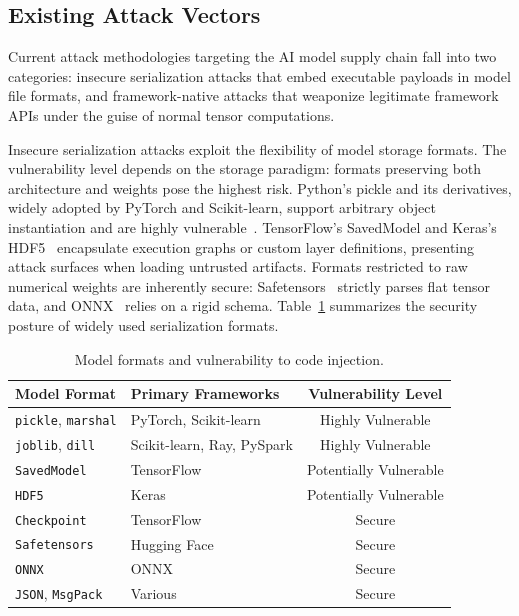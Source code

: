 \subsection{Existing Attack Vectors}


Current attack methodologies targeting the AI model supply chain fall into two categories: insecure serialization attacks that embed executable payloads in model file formats, and framework-native attacks that weaponize legitimate framework APIs under the guise of normal tensor computations.

Insecure serialization attacks exploit the flexibility of model storage formats. The vulnerability level depends on the storage paradigm: formats preserving both architecture and weights pose the highest risk. Python's pickle and its derivatives, widely adopted by PyTorch and Scikit-learn, support arbitrary object instantiation and are highly vulnerable~\cite{python_pickle, liu2025arthideseekmaking}. TensorFlow's SavedModel and Keras's HDF5~\cite{hdf5} encapsulate execution graphs or custom layer definitions, presenting attack surfaces when loading untrusted artifacts. Formats restricted to raw numerical weights are inherently secure: Safetensors~\cite{safetensors2023} strictly parses flat tensor data, and ONNX~\cite{onnx2019} relies on a rigid schema. Table~\ref{tab:formats} summarizes the security posture of widely used serialization formats.

\begin{table}[t!]
    \scriptsize
    \centering
    \caption{Model formats and vulnerability to code injection.}
    \begin{tabular}{llc}
        \hline
        \textbf{Model Format} & \textbf{Primary Frameworks} & \textbf{Vulnerability Level} \\ \hline
        \texttt{pickle}, \texttt{marshal} & PyTorch, Scikit-learn & Highly Vulnerable \\
        \texttt{joblib}, \texttt{dill} & Scikit-learn, Ray, PySpark & Highly Vulnerable \\
        
        \texttt{SavedModel} & TensorFlow & Potentially Vulnerable \\
        \texttt{HDF5} & Keras & Potentially Vulnerable \\
        
        \texttt{Checkpoint} & TensorFlow & Secure \\
        \texttt{Safetensors} & Hugging Face & Secure \\
        \texttt{ONNX} & ONNX & Secure \\
        \texttt{JSON}, \texttt{MsgPack} & Various & Secure \\ \hline
    \end{tabular}
    \label{tab:formats}
\end{table}

